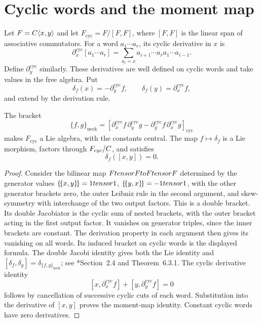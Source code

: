 \section{Cyclic words and the moment map}
Let $F=C\langle x,y\rangle$ and let $F_{\mathrm{cyc}}=F/[F,F]$,
where $[F,F]$ is the linear span of associative commutators.
For a word $a_1\cdots a_r$, its cyclic derivative in $x$ is
\[
 \partial_x^{\mathrm{cyc}}[a_1\cdots a_r]
 =\sum_{a_i=x}a_{i+1}\cdots a_ra_1\cdots a_{i-1}.
\]
Define $\partial_y^{\mathrm{cyc}}$ similarly.
These derivatives are well defined on cyclic words and take values
in the free algebra.  Put
\[
 \delta_f(x)=-\partial_y^{\mathrm{cyc}}f,
 \qquad \delta_f(y)=\partial_x^{\mathrm{cyc}}f,
\]
and extend by the derivation rule.

\begin{theorem}
The bracket
\[
 \{f,g\}_{\mathrm{neck}}
 =\left[
   \partial_x^{\mathrm{cyc}}f\,\partial_y^{\mathrm{cyc}}g
  -\partial_y^{\mathrm{cyc}}f\,\partial_x^{\mathrm{cyc}}g
  \right]_{\mathrm{cyc}}
\]
makes $F_{\mathrm{cyc}}$ a Lie algebra, with the constants central.
The map $f\mapsto\delta_f$ is a Lie morphism, factors through
$F_{cyc}/C$, and satisfies
\[
 \delta_f([x,y])=0.
\]
\end{theorem}
\begin{proof}
Consider the bilinear map $Ftensor Fto Ftensor F$ determined by
the generator values
$\{\!\{x,y\}\!\}=1tensor1$,
$\{\!\{y,x\}\!\}=-1tensor1$, with the other generator brackets
zero, the outer Leibniz rule in the second argument, and skew-symmetry
with interchange of the two output factors.
This is a double bracket.  Its double Jacobiator is the cyclic sum
of nested brackets, with the outer bracket acting in the first output
factor.  It vanishes on generator triples, since the inner brackets
are constant.  The derivation property in each argument then gives
its vanishing on all words.
Its induced bracket on cyclic words is the displayed formula.
The double Jacobi identity gives both the Lie identity and
$[\delta_f,\delta_g]=\delta_{\{f,g\}_{\mathrm{neck}}}$;
see \cite{VanDenBerghDouble}*{Section~2.4 and Theorem~6.3.1}.
The cyclic derivative identity
\[
 [x,\partial_x^{\mathrm{cyc}}f]
 +[y,\partial_y^{\mathrm{cyc}}f]=0
\]
follows by cancellation of successive cyclic cuts of each word.
Substitution into the derivative of $[x,y]$ proves the moment-map
identity.  Constant cyclic words have zero derivatives.
\end{proof}

